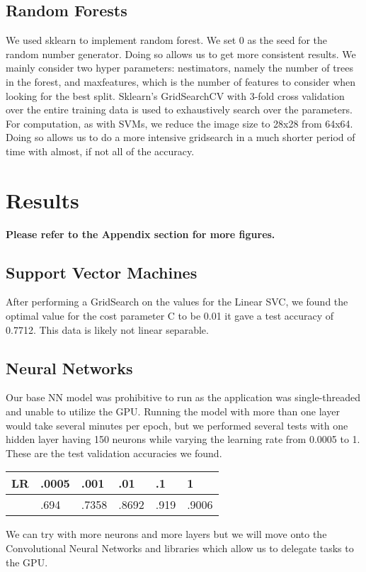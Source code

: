 \documentclass[twoside,twocolumn]{article}
\begin{document}
\subsection{Random Forests}
We used sklearn to implement random forest. We set 0 as the seed for the random number generator. Doing so allows us to get more consistent results. We mainly consider two hyper parameters: n\textunderscore estimators, namely the number of trees in the forest, and max\textunderscore features, which is the number of features to consider when looking for the best split. Sklearn's GridSearchCV with 3-fold cross validation over the entire training data is used to exhaustively search over the parameters. For computation, as with SVMs, we reduce the image size to 28x28 from 64x64. Doing so allows us to do a more intensive gridsearch in a much shorter period of time with almost, if not all of the accuracy.


\section{Results}
\textbf{Please refer to the Appendix section for more figures.}
\subsection{Support Vector Machines}
After performing a GridSearch on the values for the Linear SVC, we found the optimal value for the cost parameter C to be 0.01 it gave a test accuracy of 0.7712. This data is likely not linear separable. 
\subsection{Neural Networks}
Our base NN model was prohibitive to run as the application was single-threaded and unable to utilize the GPU. Running the model with more than one layer would take several minutes per epoch, but we performed several tests with one hidden layer having 150 neurons while varying the learning rate from 0.0005 to 1. These are the test validation accuracies we found.
\begin{center}
    \begin{tabular}{ | l | l | l | l | l | l |}
    \hline
    LR & .0005 & .001 & .01 & .1 & 1 \\ \hline
       & .694  & .7358 & .8692   & .919 & .9006 \\ \hline
    \end{tabular}
\end{center}
We can try with more neurons and more layers but we will move onto the Convolutional Neural Networks and libraries which allow us to delegate tasks to the GPU.
\end{document}
